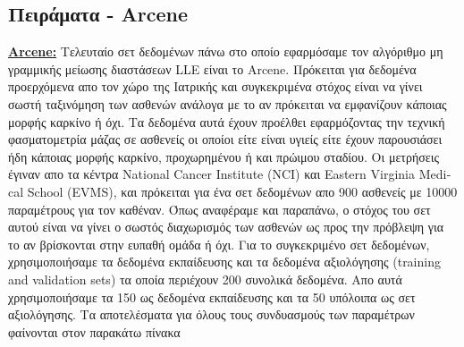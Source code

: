 \subsection{Πειράματα - \textlatin{Arcene}}
\par
\href{http://archive.ics.uci.edu/ml/datasets/Arcene}{\textbf{\textlatin{Arcene:}}\textlatin{\cite{15}}} Τελευταίο σετ δεδομένων πάνω στο οποίο εφαρμόσαμε τον αλγόριθμο μη γραμμικής μείωσης διαστάσεων \textlatin{LLE} είναι το \textlatin{Arcene}\textlatin{\cite{15}}. Πρόκειται για δεδομένα προερχόμενα απο τον χώρο της Ιατρικής και συγκεκριμένα στόχος είναι να γίνει σωστή ταξινόμηση των ασθενών ανάλογα με το αν πρόκειται να εμφανίζουν κάποιας μορφής καρκίνο ή όχι. Τα δεδομένα αυτά έχουν προέλθει εφαρμόζοντας την τεχνική φασματομετρία μάζας σε ασθενείς οι οποίοι είτε είναι υγιείς είτε έχουν παρουσιάσει ήδη κάποιας μορφής καρκίνο, προχωρημένου ή και πρώιμου σταδίου. Οι μετρήσεις έγιναν απο τα κέντρα \textlatin{National Cancer Institute (NCI)} και \textlatin{ Eastern Virginia Medical School (EVMS)}, και πρόκειται για ένα σετ δεδομένων απο 900 ασθενείς με 10000 παραμέτρους για τον καθέναν. Όπως αναφέραμε και παραπάνω, ο στόχος του σετ αυτού είναι να γίνει ο σωστός διαχωρισμός των ασθενών ως προς την πρόβλεψη για το αν βρίσκονται στην ευπαθή ομάδα ή όχι. Για το συγκεκριμένο σετ δεδομένων, χρησιμοποιήσαμε τα δεδομένα εκπαίδευσης και τα δεδομένα αξιολόγησης (\textlatin{training and validation sets}) τα οποία περιέχουν 200 συνολικά δεδομένα. Απο αυτά χρησιμοποιήσαμε τα 150 ως δεδομένα εκπαίδευσης και τα 50 υπόλοιπα ως σετ αξιολόγησης. Τα αποτελέσματα για όλους τους συνδυασμούς των παραμέτρων φαίνονται στον παρακάτω πίνακα

